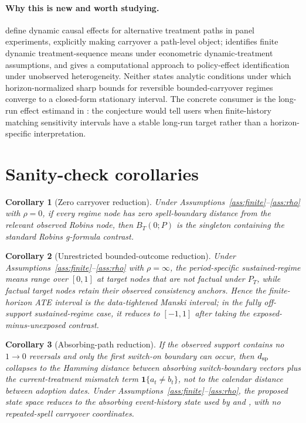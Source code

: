 \documentclass[11pt]{article}
\newcommand{\one}{\mathbf{1}}
\theoremstyle{definition}
\theoremstyle{plain}
\newtheorem{corollary}{Corollary}
\theoremstyle{remark}
\begin{document}
\paragraph{Why this is new and worth studying.}
\citet{BojinovRambachanShephard2021} define dynamic causal effects for
alternative treatment paths in panel experiments, explicitly making carryover a
path-level object; \citet{Han2021} identifies finite dynamic treatment-sequence
means under
econometric dynamic-treatment assumptions, and \citet{HanYang2024} gives a
computational approach to policy-effect identification under unobserved
heterogeneity.  Neither states analytic conditions under which
horizon-normalized sharp bounds for reversible bounded-carryover regimes
converge to a closed-form stationary interval.  The concrete consumer is the
long-run effect estimand in \citet{ImaiKimWang2023}: the conjecture would tell
users when finite-history matching sensitivity intervals have a stable
long-run target rather than a horizon-specific interpretation.

\section{Sanity-check corollaries}
\begin{corollary}[Zero carryover reduction]\label{cor:zero}
Under Assumptions~\ref{ass:finite}--\ref{ass:rho} with \(\rho=0\), if every
regime node has zero spell-boundary distance from the relevant observed
Robins node, then \(B_T(0;P)\) is the singleton containing the standard Robins
g-formula contrast.
\end{corollary}

\begin{corollary}[Unrestricted bounded-outcome reduction]\label{cor:infty}
Under Assumptions~\ref{ass:finite}--\ref{ass:rho} with \(\rho=\infty\), the
period-specific sustained-regime means range over \([0,1]\) at target nodes
that are not factual under \(P_T\), while factual target nodes retain their
observed consistency anchors.  Hence the finite-horizon ATE interval is the
data-tightened Manski interval; in the fully off-support sustained-regime case,
it reduces to \([-1,1]\) after taking the exposed-minus-unexposed contrast.
\end{corollary}

\begin{corollary}[Absorbing-path reduction]\label{cor:absorbing}
If the observed support contains no \(1\to0\) reversals and only the first
switch-on boundary can occur, then \(d_{\rm sp}\) collapses to the Hamming
distance between absorbing switch-boundary vectors plus the current-treatment
mismatch term \(\one\{a_t\ne b_t\}\), not to the calendar distance between
adoption dates.  Under Assumptions~\ref{ass:finite}--\ref{ass:rho}, the
proposed state space reduces to the absorbing event-history state used by
\citet{SunAbraham2021} and \citet{CallawaySantAnna2021}, with no repeated-spell
carryover coordinates.
\end{corollary}
\end{document}
